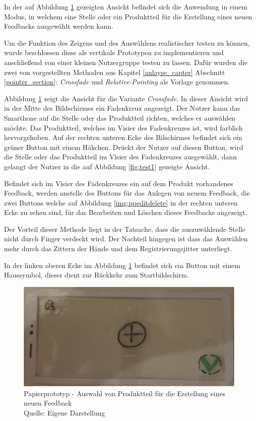 In der auf Abbildung \ref{img:ppcreate} gezeigten Ansicht befindet sich die Anwendung in einem Modus, in welchem eine Stelle oder ein Produktteil für die Erstellung eines neuen Feedbacks ausgewählt werden kann. 

Um die Funktion des Zeigens und des Auswählens realistischer testen zu können, wurde beschlossen diese als vertikale Prototypen zu implementieren und anschließend von einer kleinen Nutzergruppe testen zu lassen.
Dafür wurden die zwei von \citeauthor{Vincent2013} vorgestellten Methoden aus Kapitel \ref{anlayse_capter} Abschnitt \ref{pointer_section}: \textit{Crossfade} und \textit{Relative-Pointing} als Vorlage genommen.

Abbildung \ref{img:ppcreate} zeigt die Ansicht für die Variante \textit{Crossfade}. In dieser Ansicht wird in der Mitte des Bildschirmes ein Fadenkreuz angezeigt. Der Nutzer kann das Smarthone auf 
die Stelle oder das Produktteil richten, welches er auswählen möchte. Das Produktteil, welches im Visier des Fadenkreuzes ist, wird farblich hervorgehoben. Auf der rechten unteren Ecke des Bilschirmes befindet 
sich ein grüner Button mit einem Häkchen. Drückt der Nutzer auf diesen Button, wird die Stelle oder das Produktteil im Visier des Fadenkreuzes ausgewählt, dann gelangt der Nutzer in die auf Abbildung 
\ref{fig:test1} gezeigte Ansicht.

Befindet sich im Visier des Fadenkreuzes ein auf dem Produkt vorhandenes Feedback, werden anstelle des Buttons für das Anlegen von neuem Feedback, die zwei Buttons welche auf Abbildung \ref{img:ppeditdelete}
in der rechten unteren Ecke zu sehen sind, für das Bearbeiten und Löschen dieses Feedbacks angezeigt. 

Der Vorteil dieser Methode liegt in der Tatsache, dass die auszuwählende Stelle nicht durch Finger verdeckt wird. Der Nachteil hingegen ist dass das Auswählen mehr durch das Zittern der Hände und dem Registrierungsjitter unterliegt.

In der linken oberen Ecke im Abbildung \ref{img:ppcreate} befindet sich ein Button mit einem Haussymbol, dieser dient zur Rückkehr zum Startbildschirm.

\begin{figure}[H]
	\centering
	\includegraphics[width=.7\textwidth]{resources/conception/lowfi_create.jpg}
	\caption{Papierprototyp - Auswahl von Produktteil für die Erstellung eines neuen Feedback \\Quelle: Eigene Darstellung}
	\label{img:ppcreate}
\end{figure}

